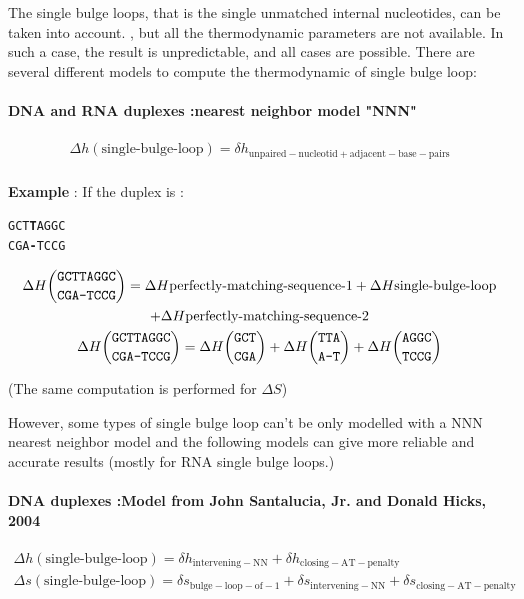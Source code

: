 \documentclass{article}
\begin{document}
The single bulge loops, that is the single unmatched internal nucleotides, can be taken into
account. , but all the thermodynamic parameters are not available. In such a case, 
the result is unpredictable, and all cases are possible. 
There are several different models to compute the thermodynamic of single bulge loop:

\paragraph{DNA and RNA duplexes :\textbf{nearest neighbor model "NNN"}} 

\begin{multline*}
\Delta h {(\mbox{single-bulge-loop})} =
\delta{}h_\mathrm{unpaired-nucleotid+adjacent-base-pairs} \\
\end{multline*}

\textbf{Example} :
If the duplex is :
\begin{alltt}
GCT\textbf{T}AGGC
CGA\textbf{-}TCCG
\end{alltt}
\begin{multline*}
\Delta H {\mbox{\texttt{GCTTAGGC}} \choose \mbox{\texttt{CGA-TCCG}}} =
\Delta H {\mbox{perfectly-matching-sequence-1}} +
\Delta H {\mbox{single-bulge-loop}} \\ +
\Delta H {\mbox{perfectly-matching-sequence-2}}\\
\Delta H {\mbox{\texttt{GCTTAGGC}} \choose \mbox{\texttt{CGA-TCCG}}} =
\Delta H {\mbox{\texttt{GCT}} \choose \mbox{\texttt{CGA}}} +
\Delta H {\mbox{\texttt{TTA}} \choose \mbox{\texttt{A-T}}} +
\Delta H {\mbox{\texttt{AGGC}} \choose \mbox{\texttt{TCCG}}}\\
\end{multline*}

       (The same computation is performed for $\Delta S$)   
  
 However, some types of single bulge loop can't be only modelled with a NNN nearest 
 neighbor model and the following models can give more reliable and accurate results (mostly
 for RNA single bulge loops.)  
  
\paragraph{DNA duplexes :\textbf{Model from John Santalucia, Jr. and Donald Hicks, 2004}} 

\begin{multline*}
\Delta h {(\mbox{single-bulge-loop})} =
\delta{}h_\mathrm{intervening-NN} +
\delta{}h_\mathrm{closing-AT-penalty}\\
\Delta s {(\mbox{single-bulge-loop})} =
\delta{}s_\mathrm{bulge-loop-of-1} +
\delta{}s_\mathrm{intervening-NN} +
\delta{}s_\mathrm{closing-AT-penalty}\\
\end{multline*}
\end{document}
